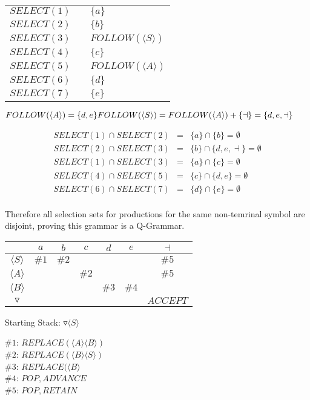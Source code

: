 \documentclass[a4paper,12pt]{article}
\newcommand{\nonterminal}[1]{\langle #1 \rangle}
\begin{document}
\begin{tabular}{lcl}
$SELECT(1)$	&	\hspace{10mm}	&	$\{a\}$	\\
$SELECT(2)$	&						&	$\{b\}$	\\
$SELECT(3)$	&						&	$FOLLOW(\nonterminal{S})$	\\
$SELECT(4)$	&						&	$\{c\}$	\\
$SELECT(5)$	&						&	$FOLLOW(\nonterminal{A})$	\\
$SELECT(6)$	&						&	$\{d\}$	\\
$SELECT(7)$	&						&	$\{e\}$	\\
\end{tabular}

$FOLLOW(\nonterminal{A}) = \{d,e\} \\
FOLLOW(\nonterminal{S}) = FOLLOW(\nonterminal{A}) + \{\dashv\} =
\{d,e,\dashv\}$

\begin{eqnarray*}
SELECT(1) \cap	SELECT(2)	&	=	&	\{a\} \cap \{b\}	= \emptyset	\\ 
SELECT(2) \cap	SELECT(3)	&	=	&	\{b\} \cap \{d,e,\dashv\}	= \emptyset	\\ 
SELECT(1) \cap	SELECT(3)	&	=	&	\{a\} \cap \{c\}	= \emptyset	\\ 
SELECT(4) \cap	SELECT(5)	&	=	&	\{c\} \cap \{d,e\}	= \emptyset	\\ 
SELECT(6) \cap	SELECT(7)	&	=	&	\{d\} \cap \{e\}	= \emptyset	\\ 
\end{eqnarray*}

Therefore all selection sets for productions for the same non-temrinal
symbol are disjoint, proving this grammar is a Q-Grammar.

\begin{tabular}{|c|c|c|c|c|c|c|}
\hline
						&	$a$	&	$b$	&	$c$	&	$d$	&	$e$	&	$\dashv$ \\
\hline
$\nonterminal{S}$	&	$\#1$	&	$\#2$	&			&			&			&	$\#5$		\\
\hline
$\nonterminal{A}$	&			&			&	$\#2$	&			&			&	$\#5$		\\
\hline
$\nonterminal{B}$	&			&			&			&	$\#3$	&	$\#4$	&				\\
\hline
$\triangledown$	&			&			&			&			&			& $ACCEPT$	\\
\hline
\end{tabular}

Starting Stack: $\triangledown \nonterminal{S}$

$\#1$: $REPLACE(\nonterminal{A}\nonterminal{B})$ \\
$\#2$: $REPLACE(\nonterminal{B}\nonterminal{S})$ \\
$\#3$: $REPLACE(\nonterminal{B}$ \\
$\#4$: $POP,ADVANCE$ \\
$\#5$: $POP,RETAIN$ \\
\end{document}
